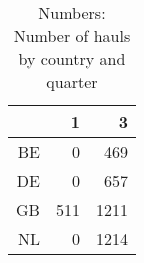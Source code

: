 \begin{table}[ht]
\centering
\begin{tabular}{rrr}
  \hline
 & 1 & 3 \\ 
  \hline
BE & 0 & 469 \\ 
  DE & 0 & 657 \\ 
  GB & 511 & 1211 \\ 
  NL & 0 & 1214 \\ 
   \hline
\end{tabular}
\caption{Numbers: Number of hauls by country and quarter} 
\end{table}
